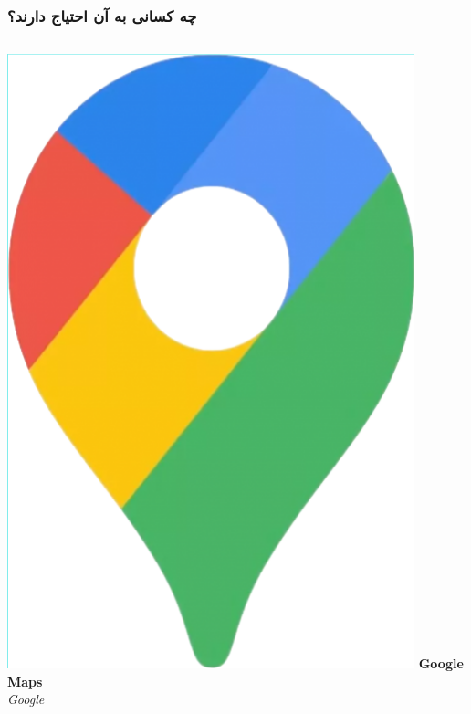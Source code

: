 \documentclass{beamer}
\begin{document}
\begin{persian}
\begin{frame}
  \frametitle{چه کسانی به آن احتیاج دارند؟}
  \begin{columns}
    \includegraphics[height=0.5\textheight]{./img/google-maps.png}
    \textbf{Google Maps}\\
    \textit{Google}

\end{columns}
\end{frame}
\end{persian}
\end{document}
